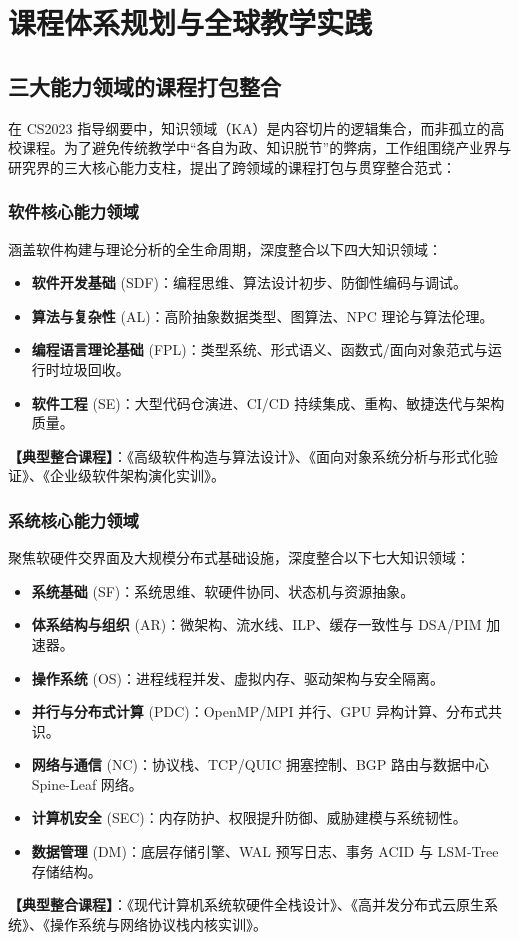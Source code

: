 \chapter{课程体系规划与全球教学实践}

\section{三大能力领域的课程打包整合}

\begin{preamblebox}[从孤立课程走向能力集聚]
在 CS2023 指导纲要中，知识领域（KA）是内容切片的逻辑集合，而非孤立的高校课程。为了避免传统教学中“各自为政、知识脱节”的弊病，工作组围绕产业界与研究界的三大核心能力支柱，提出了跨领域的课程打包与贯穿整合范式：
\end{preamblebox}

\subsection{软件核心能力领域}
涵盖软件构建与理论分析的全生命周期，深度整合以下四大知识领域：
\begin{itemize}
    \item \textbf{软件开发基础} (SDF)：编程思维、算法设计初步、防御性编码与调试。
    \item \textbf{算法与复杂性} (AL)：高阶抽象数据类型、图算法、NPC 理论与算法伦理。
    \item \textbf{编程语言理论基础} (FPL)：类型系统、形式语义、函数式/面向对象范式与运行时垃圾回收。
    \item \textbf{软件工程} (SE)：大型代码仓演进、CI/CD 持续集成、重构、敏捷迭代与架构质量。
\end{itemize}
\textbf{【典型整合课程】}：《高级软件构造与算法设计》、《面向对象系统分析与形式化验证》、《企业级软件架构演化实训》。

\subsection{系统核心能力领域}
聚焦软硬件交界面及大规模分布式基础设施，深度整合以下七大知识领域：
\begin{itemize}
    \item \textbf{系统基础} (SF)：系统思维、软硬件协同、状态机与资源抽象。
    \item \textbf{体系结构与组织} (AR)：微架构、流水线、ILP、缓存一致性与 DSA/PIM 加速器。
    \item \textbf{操作系统} (OS)：进程线程并发、虚拟内存、驱动架构与安全隔离。
    \item \textbf{并行与分布式计算} (PDC)：OpenMP/MPI 并行、GPU 异构计算、分布式共识。
    \item \textbf{网络与通信} (NC)：协议栈、TCP/QUIC 拥塞控制、BGP 路由与数据中心 Spine-Leaf 网络。
    \item \textbf{计算机安全} (SEC)：内存防护、权限提升防御、威胁建模与系统韧性。
    \item \textbf{数据管理} (DM)：底层存储引擎、WAL 预写日志、事务 ACID 与 LSM-Tree 存储结构。
\end{itemize}
\textbf{【典型整合课程】}：《现代计算机系统软硬件全栈设计》、《高并发分布式云原生系统》、《操作系统与网络协议栈内核实训》。

